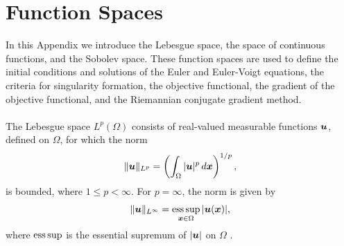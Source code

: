 \chapter{Function Spaces}
\label{app:function:spaces}

In this Appendix we introduce the Lebesgue space, {\color{red}the space of continuous functions}, and the Sobolev space. These function spaces are used to define the initial conditions and solutions of the Euler and Euler-Voigt equations, the criteria for singularity formation, the objective functional, the gradient of the objective functional, and the Riemannian conjugate gradient method. 
\\~\\
The Lebesgue space $L^p(\Omega)$ consists of real-valued measurable functions $\boldsymbol u$, defined on $\Omega$, for which the norm
\begin{equation*}
\|\boldsymbol u\|_{L^p} = \left( \int_{\Omega} |\boldsymbol u|^p\,d\boldsymbol x \right)^{1/p},
\end{equation*}
 is bounded, where $1\leq p < \infty$. For $p=\infty$, the norm is given by
\begin{equation*}
\|\boldsymbol u\|_{L^\infty} = \operatorname*{ess\,sup}_{\boldsymbol x\in\Omega} |\boldsymbol u(\boldsymbol x)|,
\end{equation*}
where $\operatorname*{ess\,sup}$ is the essential supremum of $|\boldsymbol u|$ on $\Omega$ \cite{fournier_sobolev_2003,robinson_three-dimensional_2016}.
\\~\\
